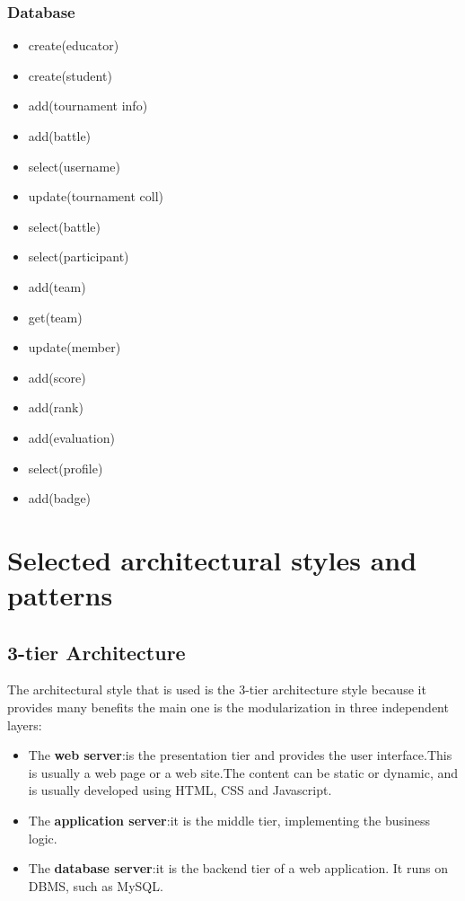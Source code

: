     \subsubsection{Database}
    \begin{itemize}
        \item create(educator)
        \item create(student)
        \item add(tournament info)
        \item add(battle)
        \item select(username)
        \item update(tournament coll)
        \item select(battle)
        \item select(participant)
        \item add(team)
        \item get(team)
        \item update(member)
        \item add(score)
        \item add(rank)
        \item add(evaluation)
        \item select(profile)
        \item add(badge)
    \end{itemize}

\pagebreak
\section{Selected architectural styles and patterns}
\subsection{3-tier Architecture}
The architectural style that is used is the 3-tier architecture style because it provides many benefits the main one is the modularization in three independent layers:

            \begin{itemize}
                \item  The \textbf{ web server}:is the presentation tier and provides the user interface.This is usually a web page or a web site.The content can be static or dynamic, and is usually developed using HTML, CSS and Javascript.
                \item The \textbf{application server}:it is the middle tier, implementing the business logic.
                \item The \textbf{database server}:it is the backend tier of a web application. It runs on DBMS, such as MySQL.
            \end{itemize}

